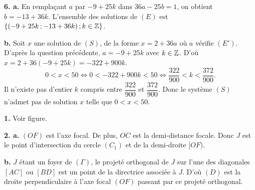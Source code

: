 \documentclass[11pt]{article}
\begin{document}
\textbf{6. a.} En remplaçant $a$ par $-9 + 25k$ dans $36a - 25b = 1$, on obtient $b = -13 + 36k$. L'ensemble des solutions de $(E)$ est $\{(-9 + 25k\,;-13 + 36k)\,;k \in \mathbb{Z}\}$.

\textbf{b.} Soit $x$ une solution de $(S)$, de la forme $x = 2 + 36a$ où $a$ vérifie $(E')$. D'après la question précédente, $a = -9 + 25k$ avec $k \in \mathbb{Z}$. D'où $x = 2 + 36(-9 + 25k) = -322 + 900k$.
\[ 0 < x < 50 \Longleftrightarrow 0 < -322 + 900k < 50 \Longleftrightarrow \frac{322}{900} < k < \frac{372}{900}. \]
Il n'existe pas d'entier $k$ compris entre $\dfrac{322}{900}$ et $\dfrac{372}{900}$. Donc le système $(S)$ n'admet pas de solution $x$ telle que $0 < x < 50$.


\begin{center}
\end{center}

\textbf{1.} Voir figure.

\textbf{2. a.} $(OF)$ est l'axe focal. De plus, $OC$ est la demi-distance focale. Donc $J$ est le point d'intersection du cercle $(C_1)$ et de la demi-droite $[OF)$.

\textbf{b.} $J$ étant un foyer de $(\Gamma)$, le projeté orthogonal de $J$ sur l'une des diagonales $[AC]$ ou $[BD]$ est un point de la directrice associée à $J$. D'où $(D)$ est la droite perpendiculaire à l'axe focal $(OF)$ passant par ce projeté orthogonal.
\end{document}

